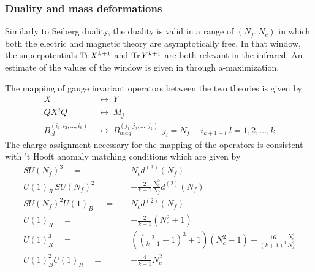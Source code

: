 \subsubsection{Duality and mass deformations}
Similarly to Seiberg duality, the duality is valid in a range of $(N_f,N_c)$ in which both the electric and magnetic theory are asymptotically free. 
In that window, the superpotentials $\mathrm{Tr } \, X^{k+1}$ and $\mathrm{Tr } \, Y^{k+1}$ are both relevant in the infrared.
An estimate of the values of the window is given in \cite{Kutasov:2003iy} through a-maximization.  



The mapping of gauge invariant operators between the two theories is given by
\begin{align}
X \; & \longleftrightarrow \; Y \\
Q X^j \tilde{Q} \; & \longleftrightarrow  \; M_j \\
B^{(i_1, i_2, \dotsc, i_k)}_{el} \; & \longleftrightarrow \; B_{mag}^{(j_1, j_2 ,\dotsc, j_k) } \;  \, j_l = N_f - i_{k+1-l} \; l = 1,2,\dotsc,k
\end{align}
The charge assignment necessary for the mapping of the operators is consistent with 't Hooft anomaly matching conditions which are given by
\begin{align}
SU(N_f)^3 \quad = \quad   & N_c d^{(3)}(N_f) \\
U(1)_R\, SU(N_f)^2 \quad = \quad  & -\frac{2}{k+1} \frac{N_c^2}{N_f} d^{(2)} (N_f) \\
SU(N_f)^2 U(1)_B\ \quad = \quad  & N_c d^{(2)}(N_f) \\
U(1)_R \quad = \quad  & - \frac{2}{k+1} (N_c^2 + 1) \\
U(1)_R^3 \quad = \quad  & \left( \left(\frac{2}{k+1} -1 \right)^3 +1 \right) (N_c^2-1) - \frac{16}{(k+1)^3} \frac{N_c^4}{N_f^2} \\
U(1)_B^2 U(1)_R \quad = \quad  & - \frac{4}{k+1} N_c^2
\end{align}


